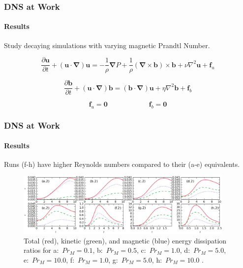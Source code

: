 \documentclass{beamer}
\begin{document}
\begin{frame}
 \frametitle{DNS at Work}
 \framesubtitle{Results}
 
 Study decaying simulations with varying magnetic Prandtl Number. \pause
 
 \begin{equation}
  \frac{\partial \bm u}{\partial t} + (\bm u \cdot \bm \nabla) \bm u = - \frac{1}{\rho} \bm \nabla P + \frac{1}{\rho} (\bm \nabla \times \bm b) \times \bm b + \nu \nabla ^ 2 \bm u + \bm f_u
 \end{equation} %
 
 \begin{equation}
  \frac{\partial \bm b}{\partial t} + (\bm u \cdot \bm \nabla) \bm b = (\bm b \cdot \bm \nabla) \bm u + \eta \nabla ^ 2 \bm b + \bm f_b
 \end{equation}
 
 \begin{equation}
  \bm f_u = \bm 0 \qquad \qquad \qquad \bm f_b = \bm 0
 \end{equation}

 
\end{frame}


 
 
 

\begin{frame}
 \frametitle{DNS at Work}
 \framesubtitle{Results}
 
 Runs (f-h) have higher Reynolds numbers compared to their (a-e) equivalents.
 
 \begin{figure}
  \includegraphics[width=0.95\textwidth]{img/energy_dissipation_prm.png}
  \caption{Total (red), kinetic (green), and magnetic (blue) energy dissipation ratios for a:~$Pr_M = 0.1$, b:~$Pr_M = 0.5$, c:~$Pr_M = 1.0$, d:~$Pr_M = 5.0$, e:~$Pr_M = 10.0$, f:~$Pr_M = 1.0$, g:~$Pr_M = 5.0$, h:~$Pr_M = 10.0$ \cite{sahoo2011systematics}.}
  \centering
 \end{figure}
 
\end{frame}
\end{document}
